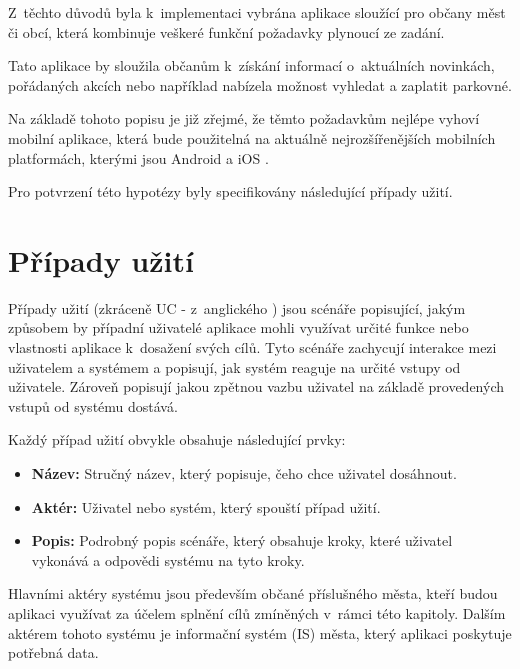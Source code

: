 Z~těchto důvodů byla k~implementaci vybrána aplikace sloužící pro občany měst či obcí, která kombinuje veškeré funkční požadavky plynoucí ze zadání.

Tato aplikace by sloužila občanům k~získání informací o~aktuálních novinkách, pořádaných akcích nebo například nabízela možnost vyhledat a zaplatit parkovné.

\medskip

Na základě tohoto popisu je již zřejmé, že těmto požadavkům nejlépe vyhoví mobilní aplikace, která bude použitelná na aktuálně nejrozšířenějších
mobilních platformách, kterými jsou Android a iOS \cite{iosAndroid}. 


Pro potvrzení této hypotézy byly specifikovány následující případy užití.

\section{Případy užití}
Případy užití  (zkráceně UC - z~anglického ) jsou scénáře popisující, jakým způsobem by případní uživatelé aplikace mohli využívat určité funkce nebo
vlastnosti aplikace k~dosažení svých cílů. \cite{figmaUseCase} Tyto scénáře zachycují interakce mezi uživatelem a systémem a popisují, jak systém reaguje na určité vstupy od 
uživatele. Zároveň popisují jakou zpětnou vazbu uživatel na základě provedených vstupů od systému dostává.

\medskip

Každý případ užití obvykle obsahuje následující prvky:

\begin{itemize}
  \item \textbf{Název:} Stručný název, který popisuje, čeho chce uživatel dosáhnout.
  \item \textbf{Aktér:} Uživatel nebo systém, který spouští případ užití.
  \item \textbf{Popis:} Podrobný popis scénáře, který obsahuje kroky, které uživatel vykonává a odpovědi systému na tyto kroky.
\end{itemize}

Hlavními aktéry systému jsou především občané příslušného města, kteří budou aplikaci využívat za účelem splnění cílů 
zmíněných v~rámci této kapitoly. 
Dalším aktérem tohoto systému je informační systém (IS) města, který aplikaci poskytuje potřebná data. 


